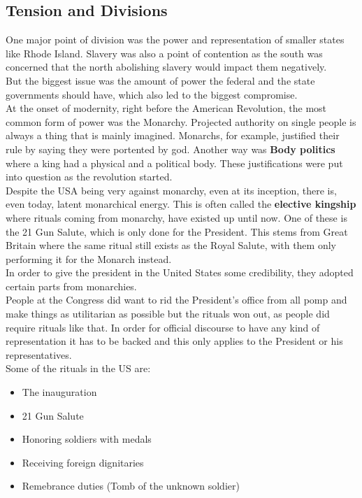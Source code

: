 \documentclass{article}
\begin{document}
	\subsection{Tension and Divisions}
	One major point of division was the power and representation of smaller states like Rhode Island. Slavery was also a point of contention as the south was concerned that the north abolishing slavery would impact them negatively. \\
	But the biggest issue was the amount of power the federal and the state governments should have, which also led to the biggest compromise. \\
	At the onset of modernity, right before the American Revolution, the most common form of power was the Monarchy. Projected authority on single people is always a thing that is mainly imagined. Monarchs, for example, justified their rule by saying they were portented by god. Another way was \textbf{Body politics} where a king had a physical and a political body. These justifications were put into question as the revolution started. \\
	Despite the USA being very against monarchy, even at its inception, there is, even today, latent monarchical energy. This is often called the \textbf{elective kingship} where rituals coming from monarchy, have existed up until now. One of these is the 21 Gun Salute, which is only done for the President. This stems from Great Britain where the same ritual still exists as the Royal Salute, with them only performing it for the Monarch instead. \\
	In order to give the president in the United States some credibility, they adopted certain parts from monarchies. \\
	People at the Congress did want to rid the President's office from all pomp and make things as utilitarian as possible but the rituals won out, as people did require rituals like that. In order for official discourse to have any kind of representation it has to be backed and this only applies to the President or his representatives. \\
	Some of the rituals in the US are: 
	\begin{itemize}
		\item{The inauguration}
		\item{21 Gun Salute}
		\item{Honoring soldiers with medals}
		\item{Receiving foreign dignitaries}
		\item{Remebrance duties (Tomb of the unknown soldier)}
	\end{itemize}
\end{document}
